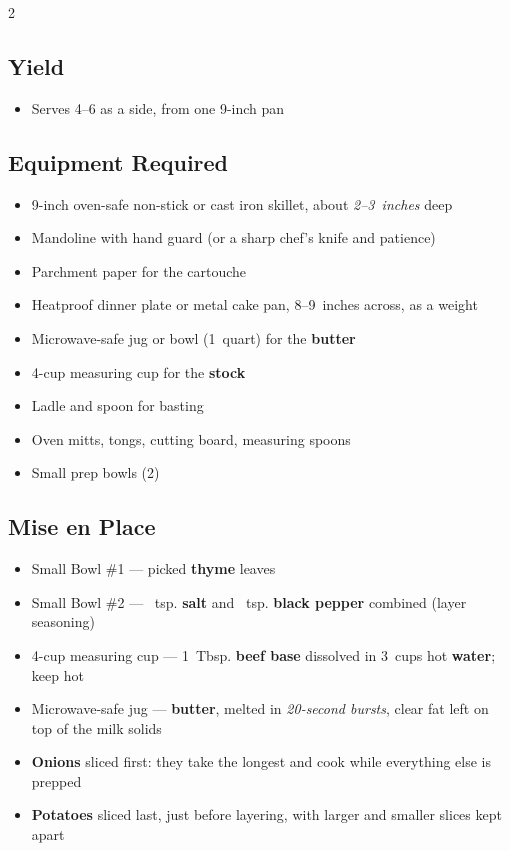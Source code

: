 \documentclass[11pt,letterpaper]{article}
\begin{document}
\newpage

{\footnotesize
\setlength{\columnsep}{20pt}
\setlength{\multicolsep}{6pt}
\begin{multicols}{2}
\setlength{\parindent}{0pt}
\setlength{\parskip}{2pt}
\setlength{\itemsep}{0pt}
\setlength{\parsep}{0pt}

\subsection*{Yield}
\begin{itemize}
    \item Serves 4--6 as a side, from one 9-inch pan
\end{itemize}

\subsection*{Equipment Required}
\begin{itemize}
    \item 9-inch oven-safe non-stick or cast iron skillet, about \textit{2--3~inches} deep
    \item Mandoline with hand guard (or a sharp chef's knife and patience)
    \item Parchment paper for the cartouche
    \item Heatproof dinner plate or metal cake pan, 8--9~inches across, as a weight
    \item Microwave-safe jug or bowl (1~quart) for the \textbf{butter}
    \item 4-cup measuring cup for the \textbf{stock}
    \item Ladle and spoon for basting
    \item Oven mitts, tongs, cutting board, measuring spoons
    \item Small prep bowls (2)
\end{itemize}

\subsection*{Mise en Place}
\begin{itemize}
    \item Small Bowl \#1 --- picked \textbf{thyme} leaves
    \item Small Bowl \#2 --- ~tsp. \textbf{salt} and ~tsp. \textbf{black pepper} combined (layer seasoning)
    \item 4-cup measuring cup --- 1~Tbsp. \textbf{beef base} dissolved in 3~cups hot \textbf{water}; keep hot
    \item Microwave-safe jug --- \textbf{butter}, melted in \textit{20-second bursts}, clear fat left on top of the milk solids
    \item \textbf{Onions} sliced first: they take the longest and cook while everything else is prepped
    \item \textbf{Potatoes} sliced last, just before layering, with larger and smaller slices kept apart
\end{itemize}


\end{multicols}}
\end{document}
